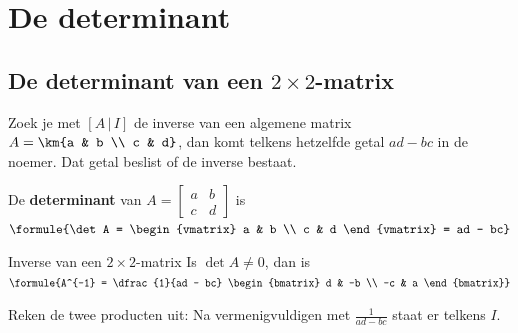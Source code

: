 \begin{oefeningen}
\end{oefeningen}

\section{De determinant}

\subsection{De determinant van een \texorpdfstring{$2 \times 2$}{2x2}-matrix}

Zoek je met $[A \,|\, I]$ de inverse van een algemene matrix $A = \km{a & b \\ c & d}$, dan komt telkens hetzelfde getal $ad - bc$ in de noemer. Dat getal beslist of de inverse bestaat.

\begin{theorie}
De \textbf{\textcolor{accent}{determinant}} van $A = \begin{bmatrix} a & b \\ c & d \end{bmatrix}$ is \quad $\formule{\det A = \begin{vmatrix} a & b \\ c & d \end{vmatrix} = ad - bc}$

\begin{stelling}{Inverse van een $2 \times 2$-matrix}
Is $\det A \neq 0$, dan is \quad $\formule{A^{-1} = \dfrac{1}{ad - bc} \begin{bmatrix} d & -b \\ -c & a \end{bmatrix}}$
\end{stelling}

\begin{bewijs}
Reken de twee producten uit:
Na vermenigvuldigen met $\frac{1}{ad - bc}$ staat er telkens $I$.
\end{bewijs}
\end{theorie}


